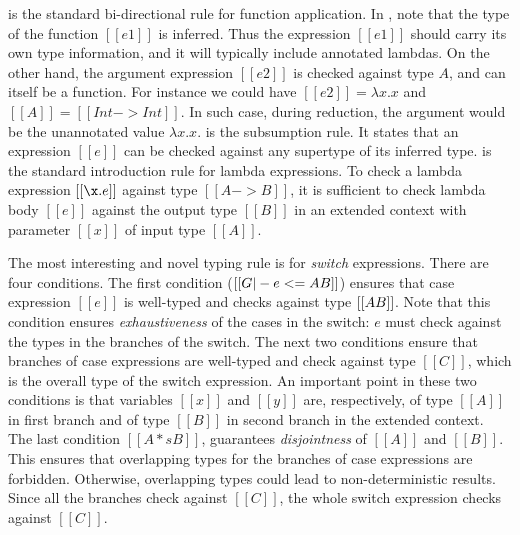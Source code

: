  is the standard bi-directional rule for
function application. In , note that the type of the
function $[[e1]]$ is inferred. Thus the expression $[[e1]]$ should carry
its own type information, and it will typically include annotated lambdas.
On the other hand, the argument expression $[[e2]]$ is checked against type $A$,
and can itself be a function. For instance we could have $[[e2]] = \lambda x. x$
and $[[A]] = [[Int->Int]]$. In such case, during reduction, the argument would be
the unannotated value $\lambda x. x$.
 is the subsumption rule. It states that an expression
$[[e]]$ can be checked against any supertype of its inferred type.
 is the standard introduction rule for lambda
expressions. To check a lambda expression $[[\x.e]]$ against type $[[A
    -> B]]$, it is sufficient to check lambda body $[[e]]$ against the
output type $[[B]]$ in an extended context with parameter $[[x]]$ of
input type $[[A]]$.

The most interesting and novel typing rule is for
\emph{switch} expressions. There are four conditions.
The first condition ($[[G |-
    e <= A \/ B]]$) ensures that case expression $[[e]]$ is well-typed
and checks against type $[[A \/ B]]$. Note that this condition ensures
\emph{exhaustiveness} of the cases in the switch: $e$ must
check against the types in the branches of the switch. 
The next two conditions ensure that
branches of case expressions are well-typed and check against type
$[[C]]$, which is the overall type of the switch expression.
An important point in these two conditions is that variables
$[[x]]$ and $[[y]]$ are, respectively, of type $[[A]]$ in first branch and of type $[[B]]$ in
second branch in the extended context. 
The last condition
$[[A *s B]]$, guarantees \emph{disjointness} of $[[A]]$ and $[[B]]$.
This ensures that overlapping types for the branches of case expressions
are forbidden. Otherwise, overlapping types could lead to
non-deterministic results.
Since all the branches check against $[[C]]$, the whole
switch expression checks against $[[C]]$.

